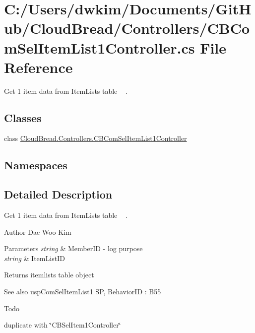 \hypertarget{a00126}{}\section{C\+:/\+Users/dwkim/\+Documents/\+Git\+Hub/\+Cloud\+Bread/\+Controllers/\+C\+B\+Com\+Sel\+Item\+List1\+Controller.cs File Reference}
\label{a00126}


Get 1 item data from Item\+Lists table ~\newline
.  


\subsection*{Classes}
\begin{DoxyCompactItemize}
\item 
class \hyperlink{a00015}{Cloud\+Bread.\+Controllers.\+C\+B\+Com\+Sel\+Item\+List1\+Controller}
\end{DoxyCompactItemize}
\subsection*{Namespaces}
\begin{DoxyCompactItemize}
\end{DoxyCompactItemize}


\subsection{Detailed Description}
Get 1 item data from Item\+Lists table ~\newline
. 

\begin{DoxyAuthor}{Author}
Dae Woo Kim 
\end{DoxyAuthor}

\begin{DoxyParams}{Parameters}
{\em string} & Member\+ID -\/ log purpose \\
\hline
{\em string} & Item\+List\+ID \\
\hline
\end{DoxyParams}
\begin{DoxyReturn}{Returns}
itemlists table object 
\end{DoxyReturn}
\begin{DoxySeeAlso}{See also}
usp\+Com\+Sel\+Item\+List1 SP, Behavior\+ID \+: B55 
\end{DoxySeeAlso}
\begin{DoxyRefDesc}{Todo}
\item[\hyperlink{a00001__todo000005}{Todo}]duplicate with \char`\"{}\+C\+B\+Sel\+Item1\+Controller\char`\"{} \end{DoxyRefDesc}
